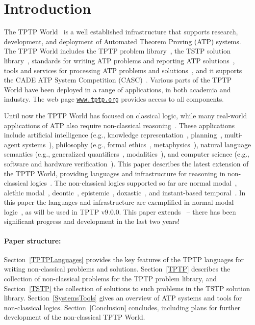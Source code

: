 \documentclass{ceurart}
\begin{document}
\section{Introduction}
\label{Introduction}

The TPTP World~\cite{Sut17} is a well established infrastructure that supports research, 
development, and deployment of Automated Theorem Proving (ATP) systems.
The TPTP World includes the TPTP problem library~\cite{Sut09}, 
the TSTP solution library~\cite{Sut10}, 
standards for writing ATP problems and reporting ATP solutions~\cite{SS+06,Sut08-KEAPPA}, 
tools and services for processing ATP problems and solutions~\cite{Sut10}, 
and it supports the CADE ATP System Competition (CASC)~\cite{Sut16}.
Various parts of the TPTP World have been deployed in a range of applications,
in both academia and industry.
The web page \href{https://www.tptp.org}{\tt www.tptp.org} provides access to all 
components.

Until now the TPTP World has focused on classical logic, while many real-world applications of 
ATP also require non-classical reasoning~\cite{SB24}.
These applications include artificial intelligence (e.g., knowledge representation~\cite{GG+11}, 
planning~\cite{LAR20}, multi-agent systems~\cite{CLS23}), philosophy (e.g., 
formal ethics~\cite{BPT20}, metaphysics~\cite{BW16}), natural language semantics (e.g., 
generalized quantifiers~\cite{vBe87}, modalities~\cite{Kra77}), and computer science (e.g., 
software and hardware verification~\cite{Bry91}).
This paper describes the latest extension of the TPTP World, providing languages and
infrastructure for reasoning in non-classical logics~\cite{Pri08,Gob01}.
The non-classical logics supported so far are
normal modal~\cite{FM98},
alethic modal~\cite{Sch06-CPL},
deontic~\cite{Hil71},
epistemic~\cite{vDH15},
doxastic~\cite{Hin62}, and
instant-based temporal~\cite{GR22}.
In this paper the languages and infrastructure are exemplified in normal modal logic~\cite{BBW06},
as will be used in TPTP v9.0.0.
This paper extends~\cite{SF+22} -- there has been significant progress and development in the 
last two years!

\paragraph{Paper structure:}
Section~\ref{TPTPLanguages} provides the key features of the TPTP languages for writing
non-classical problems and solutions. 
Section~\ref{TPTP} describes the collection of non-classical problems for the TPTP problem library, 
and Section~\ref{TSTP} the collection of solutions to such problems in the TSTP solution library.
Section~\ref{SystemsTools} gives an overview of ATP systems and tools for non-classical logics.
Section~\ref{Conclusion} concludes, including plans for further development of the non-classical
TPTP World.
\end{document}
